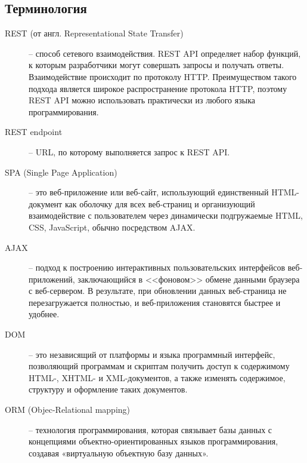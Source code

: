 \subsection{Терминология}
\begin{description}

  \item[REST (от англ. Representational State Transfer)] -- способ сетевого
    взаимодействия.  REST API определяет набор функций, к которым разработчики
    могут совершать запросы и получать ответы. Взаимодействие происходит по
    протоколу HTTP.  Преимуществом такого подхода является широкое
    распространение протокола HTTP, поэтому REST API можно использовать
    практически из любого языка программирования.

  \item[REST endpoint] -- URL, по которому выполняется запрос к REST API.

  \item[SPA (Single Page Application)] -- это веб-приложение или веб-сайт,
    использующий единственный HTML-документ как оболочку для всех веб-страниц и
    организующий взаимодействие с пользователем через динамически подгружаемые
    HTML, CSS, JavaScript, обычно посредством AJAX.

  \item[AJAX] -- подход к построению интерактивных пользовательских интерфейсов
    веб-приложений, заключающийся в <<фоновом>> обмене данными браузера с
    веб-сервером. В результате, при обновлении данных веб-страница не
    перезагружается полностью, и веб-приложения становятся быстрее и удобнее. 

  \item[DOM] -- это независящий от платформы и языка программный интерфейс,
    позволяющий программам и скриптам получить доступ к содержимому HTML-,
    XHTML- и XML-документов, а также изменять содержимое, структуру и
    оформление таких документов.
    
  \item[ORM (Objec-Relational mapping)] --
    технология программирования, которая связывает базы
    данных с концепциями объектно-ориентированных языков программирования,
    создавая «виртуальную объектную базу данных».
\end{description}
